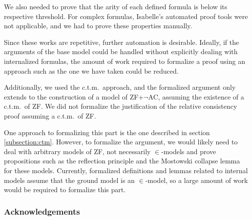 \documentclass{report}
\begin{document}
We also needed to prove that the arity of each defined formula is below its respective threshold.
For complex formulas, Isabelle's automated proof tools were not applicable, 
and we had to prove these properties manually.

Since these works are repetitive, further automation is desirable.
Ideally, if the arguments of the base model could be handled without explicitly dealing with internalized formulas, 
the amount of work required to formalize a proof using an approach such as the one we have taken could be reduced.

Additionally, we used the c.t.m.\ approach, and the formalized argument only extends to the construction of a model of ZF+$\neg$AC,
assuming the existence of a c.t.m.\ of ZF.
We did not formalize the justification of the relative consistency proof assuming a c.t.m.\ of ZF.

One approach to formalizing this part is the one described in section \ref{subsection:ctm}.
However, to formalize the argument, we would likely need to deal with arbitrary models of ZF, 
not necessarily $\in$-models and prove propositions such as the reflection principle and 
the Mostowski collapse lemma for these models.
Currently, formalized definitions and lemmas related to internal models assume that the ground model is an $\in$-model,
so a large amount of work would be required to formalize this part.
  
\subsubsection{Acknowledgements}

\printbibliography
\end{document}
